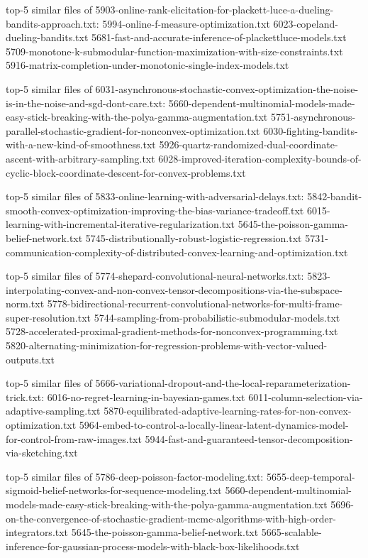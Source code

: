 \documentclass[11pt]{article}
\begin{document}
top-5 similar files of
5903-online-rank-elicitation-for-plackett-luce-a-dueling-bandits-approach.txt:
5994-online-f-measure-optimization.txt 6023-copeland-dueling-bandits.txt
5681-fast-and-accurate-inference-of-plackettluce-models.txt
5709-monotone-k-submodular-function-maximization-with-size-constraints.txt
5916-matrix-completion-under-monotonic-single-index-models.txt

top-5 similar files of
6031-asynchronous-stochastic-convex-optimization-the-noise-is-in-the-noise-and-sgd-dont-care.txt:
5660-dependent-multinomial-models-made-easy-stick-breaking-with-the-polya-gamma-augmentation.txt
5751-asynchronous-parallel-stochastic-gradient-for-nonconvex-optimization.txt
6030-fighting-bandits-with-a-new-kind-of-smoothness.txt
5926-quartz-randomized-dual-coordinate-ascent-with-arbitrary-sampling.txt
6028-improved-iteration-complexity-bounds-of-cyclic-block-coordinate-descent-for-convex-problems.txt

top-5 similar files of 5833-online-learning-with-adversarial-delays.txt:
5842-bandit-smooth-convex-optimization-improving-the-bias-variance-tradeoff.txt
6015-learning-with-incremental-iterative-regularization.txt
5645-the-poisson-gamma-belief-network.txt
5745-distributionally-robust-logistic-regression.txt
5731-communication-complexity-of-distributed-convex-learning-and-optimization.txt

top-5 similar files of 5774-shepard-convolutional-neural-networks.txt:
5823-interpolating-convex-and-non-convex-tensor-decompositions-via-the-subspace-norm.txt
5778-bidirectional-recurrent-convolutional-networks-for-multi-frame-super-resolution.txt
5744-sampling-from-probabilistic-submodular-models.txt
5728-accelerated-proximal-gradient-methods-for-nonconvex-programming.txt
5820-alternating-minimization-for-regression-problems-with-vector-valued-outputs.txt

top-5 similar files of
5666-variational-dropout-and-the-local-reparameterization-trick.txt:
6016-no-regret-learning-in-bayesian-games.txt
6011-column-selection-via-adaptive-sampling.txt
5870-equilibrated-adaptive-learning-rates-for-non-convex-optimization.txt
5964-embed-to-control-a-locally-linear-latent-dynamics-model-for-control-from-raw-images.txt
5944-fast-and-guaranteed-tensor-decomposition-via-sketching.txt

top-5 similar files of 5786-deep-poisson-factor-modeling.txt:
5655-deep-temporal-sigmoid-belief-networks-for-sequence-modeling.txt
5660-dependent-multinomial-models-made-easy-stick-breaking-with-the-polya-gamma-augmentation.txt
5696-on-the-convergence-of-stochastic-gradient-mcmc-algorithms-with-high-order-integrators.txt
5645-the-poisson-gamma-belief-network.txt
5665-scalable-inference-for-gaussian-process-models-with-black-box-likelihoods.txt
\end{document}
